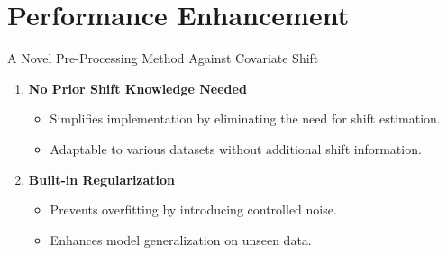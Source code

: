 \section{Performance Enhancement}



\begin{frame}{A Novel Pre-Processing Method Against Covariate Shift}
    \begin{enumerate}
        \item \textbf{No Prior Shift Knowledge Needed}
        \begin{itemize}
            \item Simplifies implementation by eliminating the need for shift estimation.
            \item Adaptable to various datasets without additional shift information.
        \end{itemize}
        
        \item \textbf{Built-in Regularization}
        \begin{itemize}
            \item Prevents overfitting by introducing controlled noise.
            \item Enhances model generalization on unseen data.
        \end{itemize}
    \end{enumerate}
\end{frame}



